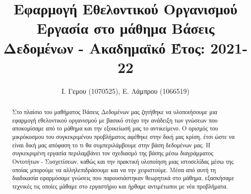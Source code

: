 \documentclass[manuscript,screen,review]{acmart}
\begin{document}
\title{Εφαρμογή Εθελοντικού Οργανισμού \\ Εργασία στο μάθημα Βάσεις Δεδομένων - Ακαδημαϊκό Έτος: 2021-22}





\author{Ι. Γεμου (1070525), Ε. Λάμπρου (1066519)}

\email{}



\begin{abstract}
  Στο πλαίσιο του μαθήματος Βάσεις Δεδομένων μας ζητήθηκε να υλοποιήσουμε μια εφαρμογή εθελοντικού οργανισμού με βασικό στόχο την ανάδειξη των γνώσεων που αποκομίσαμε από το μάθημα και την εξοικείωσή μας το αντικείμενο. Ο ορισμός του μικρόκοσμου του συγκεκριμένου προβλήματος αφέθηκε στην δική μας κρίση, έτσι ώστε να είναι δική μας απόφαση το τι θα συμπεριλάμβουμε στην βάση δεδομένων μας. Η συγκεκριμένη εργασία  περιλαμβάνει τον σχεδιασμό της βάσης μέσω διαγράμματος
Οντοτήτων - Συσχετίσεων, καθώς και την πρακτική υλοποίηση μιας ιστοσελίδας μέσω της οποίας μπορούμε να αλληλεπιδράσουμε και να την χειριστούμε. Μέσα από αυτή τη διαδικασία εφαρμόσαμε γνώσεις που παρουσιάστηκαν θεωρητικά στο μάθημα, εξασκήσαμε
τεχνικές τις οποίες μάθαμε στο εργαστήριο και ήρθαμε αντιμέτωποι με νέα προβλήματα.
\end{abstract}

\end{document}
